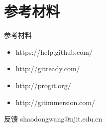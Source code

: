 \part{参考材料}

\begin{frame}[fragile]{参考材料}
    \begin{itemize}
        \item https://help.github.com/
        \item http://gitready.com/
        \item http://progit.org/
        \item http://gitimmersion.com/
    \end{itemize}
\end{frame}

\begin{frame}[<+->][fragile]{反馈}
shaodongwang@njit.edu.cn
\end{frame}


